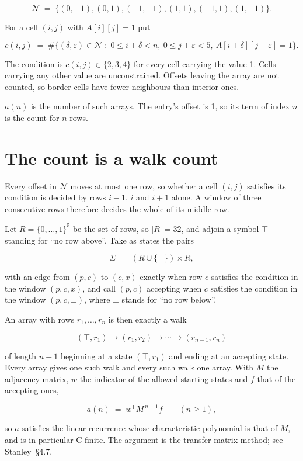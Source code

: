 \documentclass[11pt]{article}
\theoremstyle{definition}
\begin{document}
\[\mathcal{N} \;=\; \{(0,-1), (0,1), (-1,-1), (1,1), (-1,1), (1,-1)\}.\]

For a cell $(i,j)$ with $A[i][j] = 1$ put

\[c(i,j) \;=\; \#\bigl\{(\delta,\varepsilon)\in\mathcal{N} \;:\; 0\le i+\delta<n,\ 0\le j+\varepsilon<5,\ A[i+\delta][j+\varepsilon] = 1\bigr\}.\]

The condition is $c(i,j) \in \{2, 3, 4\}$ for every cell carrying the value 1. Cells carrying any other value are unconstrained. Offsets leaving the array are not counted, so border cells have fewer neighbours than interior ones.

$a(n)$ is the number of such arrays. The entry's offset is 1, so its term of index $n$ is the count for $n$ rows.

\section{The count is a walk count}

Every offset in $\mathcal{N}$ moves at most one row, so whether a cell $(i,j)$ satisfies its condition is decided by rows $i-1$, $i$ and $i+1$ alone. A window of three consecutive rows therefore decides the whole of its middle row.

Let $R = \{0,\dots,1\}^{5}$ be the set of rows, so $|R| = 32$, and adjoin a symbol $\top$ standing for ``no row above''. Take as states the pairs

\[\Sigma \;=\; (R \cup \{\top\}) \times R,\]

with an edge from $(p,c)$ to $(c,x)$ exactly when row $c$ satisfies the condition in the window $(p,c,x)$, and call $(p,c)$ accepting when $c$ satisfies the condition in the window $(p,c,\bot)$, where $\bot$ stands for ``no row below''.

An array with rows $r_1,\dots,r_n$ is then exactly a walk

\[(\top,r_1) \to (r_1,r_2) \to \cdots \to (r_{n-1},r_n)\]

of length $n-1$ beginning at a state $(\top,r_1)$ and ending at an accepting state. Every array gives one such walk and every such walk one array. With $M$ the adjacency matrix, $w$ the indicator of the allowed starting states and $f$ that of the accepting ones,

\[a(n) \;=\; w^{\mathsf T} M^{\,n-1} f \qquad (n \ge 1),\]

so $a$ satisfies the linear recurrence whose characteristic polynomial is that of $M$, and is in particular C-finite. The argument is the transfer-matrix method; see Stanley~\S4.7.
\end{document}
